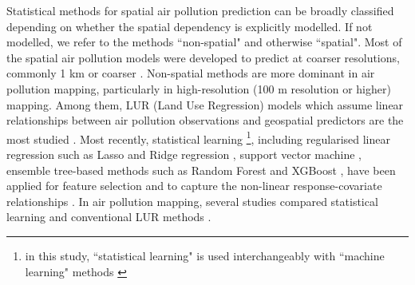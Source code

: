 \documentclass{article}
\begin{document}

Statistical methods for spatial air pollution prediction can be broadly classified depending on whether the spatial dependency is explicitly modelled. If not modelled, we refer to the methods ``non-spatial" and otherwise ``spatial". Most of the spatial air pollution models were developed to predict at coarser resolutions, commonly 1 km or coarser \citep{young2016satellite,shaddick2018data,BELOCONI2020105578}. Non-spatial methods are more dominant in air pollution mapping, particularly in high-resolution (100 m resolution or higher) mapping. Among them, LUR (Land Use Regression) models which assume linear relationships between air pollution observations and geospatial predictors are the most studied \citep{briggs2000regression,hoek2008review}. Most recently, statistical learning \footnote{in this study, ``statistical learning" is used interchangeably with ``machine learning" methods \citep{hastie2009elements}}, including regularised linear regression such as Lasso and Ridge regression \citep{James2013introduction}, support vector machine \citep{svm1999least}, ensemble tree-based methods such as Random Forest \citep[RF,][]{breiman2001random} and XGBoost \citep[XGB,][]{chen2016xgboost}, have been applied for feature selection and to capture the non-linear response-covariate relationships \citep{luglobal,chen2019comparison}. In air pollution mapping, several studies compared statistical learning and conventional LUR methods  \citep{chen2019comparison,kerckhoffs2019performance,luglobal,REN2020105827,machinereview}.
\end{document}
